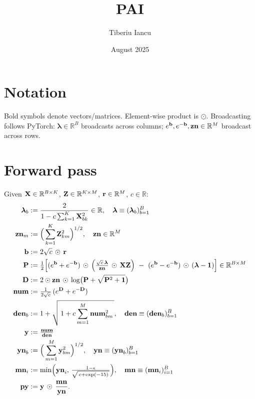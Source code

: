 \documentclass{article}
\title{PAI}
\author{Tiberiu Iancu}
\date{August 2025}
\begin{document}
\maketitle

\section*{Notation}
\newcommand{\ddfrac}[2]{\frac{\partial #1}{\partial #2}}
\newcommand{\had}{\odot}
\newcommand{\colnorm}[1]{\|#1\|_{1,\text{col}}}
\newcommand{\rownorm}[1]{\|#1\|_{1,\text{row}}}
\newcommand{\lam}{\bm{\lambda}}



Bold symbols denote vectors/matrices. Element-wise product is $\had$. Broadcasting follows PyTorch: $\lam\in\mathbb{R}^B$ broadcasts across columns; $\ev{b},\ev{-b},\v{zn}\in\mathbb{R}^M$ broadcast across rows.

\section{Forward pass}

Given $\v{X}\in\mathbb{R}^{B\times K}$, $\v{Z}\in\mathbb{R}^{K\times M}$, $\v{r}\in\mathbb{R}^{M}$, $c\in\mathbb{R}$:
\begin{align}
\lam_b &:= \frac{2}{1 - c\sum_{k=1}^K \v{X}{bk}^2}\in\mathbb{R},\quad \v{\lam}\equiv(\lam_b)_{b=1}^B \\
\v{zn}{m} &:= \Big(\sum_{k=1}^K \v{Z}{km}^2\Big)^{1/2},\quad \v{zn}\in\mathbb{R}^M \\
\v{b} &:= 2\sqrt{c}\,\had\,\v{r}\\
\v{P} &:= \tfrac12\Big[(\ev{b}+\ev{-b})\,\had\,\Big( \tfrac{\sqrt{c}\,\v{\lam}}{\v{zn}} \,\had\, \v{XZ}\Big)\ -\ (\ev{b}-\ev{-b})\,\had\,(\lam-\mathbf{1})\Big] \in \mathbb{R}^{B\times M} \\
\v{D} &:= 2\odot \v{zn}\,\had\, \log\!\big(\v{P}+\sqrt{\v{P}^2+\mathbf{1}}\big) \\
\v{num} &:= \tfrac{1}{2\sqrt{c}}\,(\ev{D}+\ev{-D}) \\
\v{den}{b} &:= 1 + \sqrt{\,1 + c \sum_{m=1}^M \v{num}{bm}^2\,},\quad \v{den}\equiv(\v{den}{b})_{b=1}^B \\
\v{y} &:= \tfrac{\v{num}}{\v{den}} \\
\v{yn}_b &:= \Big(\sum_{m=1}^M \v{y}{bm}^2\Big)^{1/2},\quad \v{yn}\equiv(\v{yn}_b)_{b=1}^B \\
\v{mn}_i &:= \min\!\Big(\v{yn}{i},\,\tfrac{1-\epsilon}{\sqrt{\,c+\exp(-15)\,}}\Big),\quad \v{mn}\equiv(\v{mn}_i)_{i=1}^B \\
\v{py} &:= \v{y}\,\had\,\frac{\v{mn}}{\v{yn}}.
\end{align}
\end{document}
